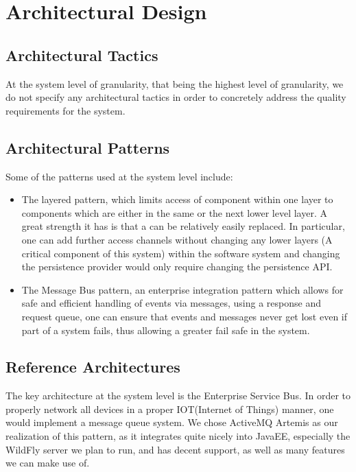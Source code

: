 \documentclass[11pt,a4paper]{article}
\begin{document}
\pagebreak

\section{Architectural Design}
\subsection{Architectural Tactics}
At the system level of granularity, that being the highest level of granularity, we do not specify any architectural tactics in order to concretely address the quality requirements for the system.
\subsection{Architectural Patterns}
Some of the patterns used at the system level include:
\begin{itemize}
	\item The layered pattern, which limits access of component within one layer to components which are either in the same or the next lower level layer. A great strength it has is that a can be relatively easily replaced. In particular, one can add further access channels without changing any lower layers (A critical component of this system) within the software system and changing the persistence provider would only require changing the persistence API.
	\item The Message Bus pattern, an enterprise integration pattern which allows for safe and efficient handling of events via messages, using a response and request queue, one can ensure that events and messages never get lost even if part of a system fails, thus allowing a greater fail safe in the system.
\end{itemize}
\subsection{Reference Architectures}
The key architecture at the system level is the Enterprise Service Bus. In order to properly network all devices in a proper IOT(Internet of Things) manner, one would implement a message queue system. We chose ActiveMQ Artemis as our realization of this pattern, as it integrates quite nicely into JavaEE, especially the WildFly server we plan to run, and has decent support, as well as many features we can make use of.

\pagebreak
\end{document}
